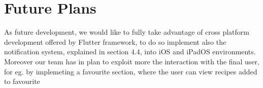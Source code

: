 \section{Future Plans}
As future development, we would like to fully take advantage of cross platform development offered by Flutter framework, to do so implement also the notification system, explained in section 4.4, into iOS and iPadOS environments.
\newline
Moreover our team has in plan to exploit more the interaction with the final user, for eg. by implemeting a favourite section, where the user can view recipes added to favourite